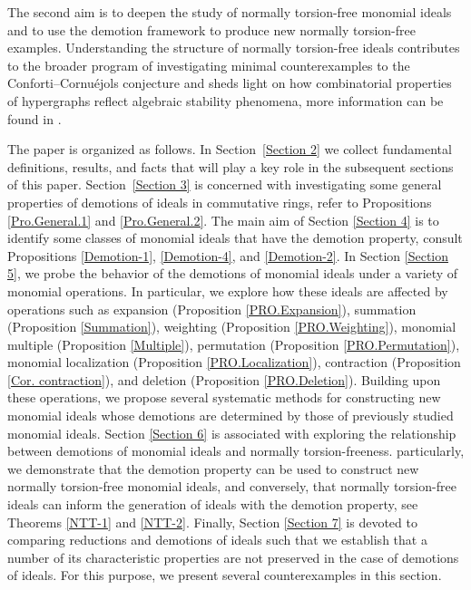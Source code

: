 \documentclass[11pt]{amsart}
\begin{document}
The second aim is to deepen the study of normally torsion-free monomial ideals and to use the demotion framework to produce new normally torsion-free examples. Understanding the structure of normally torsion-free ideals contributes to the broader program of investigating minimal counterexamples to the Conforti–Cornu\'e{j}ols conjecture and sheds light on how combinatorial properties of hypergraphs reflect algebraic stability phenomena, more information can be found in \cite{BNT}. 


The paper is organized as follows. In Section~\ref{Section 2} we collect fundamental definitions, results, and facts that
will play a key role in the subsequent sections of this paper.
 Section~\ref{Section 3} is concerned with  investigating  some general properties of demotions of ideals in commutative rings, refer to Propositions 
 \ref{Pro.General.1} and \ref{Pro.General.2}. The main aim of Section \ref{Section 4} is to identify some classes of monomial ideals that have the demotion property, consult  Propositions \ref{Demotion-1}, \ref{Demotion-4}, and \ref{Demotion-2}.  
 In Section \ref{Section 5}, we probe  the behavior of the demotions of monomial ideals under a variety of monomial operations. In particular, we explore how these ideals are affected by operations such as expansion (Proposition \ref{PRO.Expansion}), summation (Proposition \ref{Summation}), 
  weighting (Proposition \ref{PRO.Weighting}), 
 monomial multiple (Proposition \ref{Multiple}), permutation (Proposition \ref{PRO.Permutation}), monomial localization (Proposition \ref{PRO.Localization}), contraction (Proposition \ref{Cor. contraction}), and deletion (Proposition \ref{PRO.Deletion}). Building upon these operations, we propose several systematic methods for constructing new monomial ideals whose demotions are determined by those of previously studied monomial ideals. 
 Section \ref{Section 6} is associated with  exploring  the relationship between demotions of monomial ideals and normally torsion-freeness. 
 particularly, we demonstrate that the demotion property can be used to construct new normally torsion-free monomial ideals, 
   and conversely, that normally torsion-free ideals can inform the generation of ideals with the demotion property, see Theorems \ref{NTT-1} and \ref{NTT-2}. 
 Finally,   Section \ref{Section 7} is devoted to comparing  reductions and demotions of ideals such that  we establish that a number of its characteristic properties are not preserved in the case of demotions of ideals. For this purpose, we present several counterexamples in this section.
 
\end{document}
